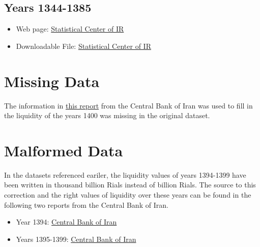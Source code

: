 \documentclass[fleqn]{report}
\begin{document}
\subsection*{Years 1344-1385}
\begin{itemize}
    \item Web page: \href{https://www.amar.org.ir/%D8%AF%D8%A7%D8%AF%D9%87%D9%87%D8%A7-%D9%88-%D8%A7%D8%B7%D9%84%D8%A7%D8%B9%D8%A7%D8%AA-%D8%A2%D9%85%D8%A7%D8%B1%DB%8C/%D9%BE%D9%88%D9%84%DB%8C-%D9%88-%D9%85%D8%A7%D9%84%DB%8C/%D8%A7%D9%85%D9%88%D8%B1-%D8%A8%D8%A7%D9%86%DA%A9%DB%8C-%D9%88-%D9%BE%D9%88%D9%84%DB%8C}{Statistical Center of IR}
    \item Downloadable File: \href{https://www.google.com/url?q=https://www.amar.org.ir/Portals/0/PropertyAgent/461/Files/615/naghdinegi_esfand85-1344.xls&sa=D&source=docs&ust=1660713151353064&usg=AOvVaw1xvy_whXwRzHEztm8-MUzK}{Statistical Center of IR}
\end{itemize}

\section*{Missing Data}
The information in 
\href{https://www.cbi.ir/showitem/23406.aspx}{this report}
 from the Central Bank of Iran was used to fill in the liquidity of the years 1400 was missing in the original dataset. 

\section*{Malformed Data}
In the datasets referenced eariler, the liquidity values of years 1394-1399 have been written in thousand billion Rials instead of billion Rials. The source to this correction and the right values of liquidity over these years can be found in the following two reports from the Central Bank of Iran.

\begin{itemize}
    \item Year 1394: \href{https://www.cbi.ir/page/16349.aspx}{Central Bank of Iran} 
    \item Years 1395-1399: \href{https://www.cbi.ir/Newestdoc.aspx?id=0&dn=AnnualReview_fa&dl=1}{Central Bank of Iran} 
\end{itemize}

 
\end{document}
